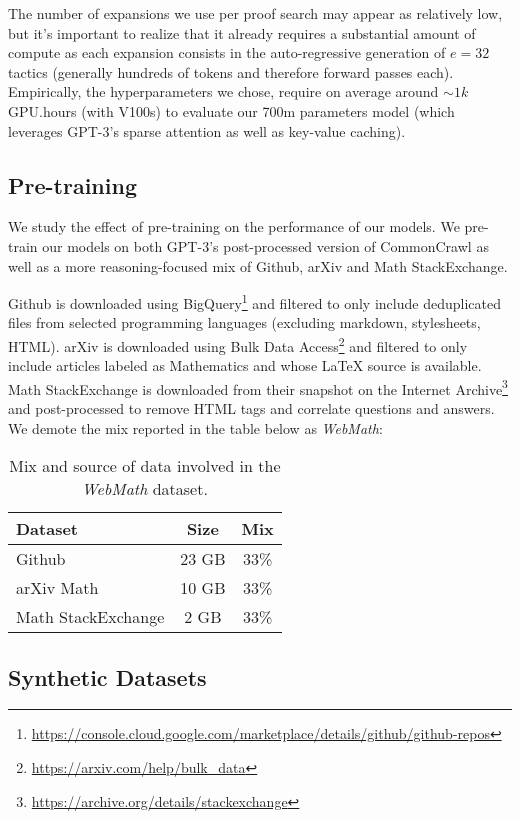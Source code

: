 \documentclass{article}
\begin{document}
The number of expansions we use per proof search may appear as relatively low, but it's important to realize that it already requires a substantial amount of compute as each expansion consists in the auto-regressive generation of $e=32$ tactics (generally hundreds of tokens and therefore forward passes each). Empirically, the hyperparameters we chose, require on average around $\sim 1k$ GPU.hours (with V100s) to evaluate our 700m parameters model (which leverages GPT-3's sparse attention as well as key-value caching).

\subsection{Pre-training}

We study the effect of pre-training on the performance of our models. We pre-train our models on both GPT-3's post-processed version of CommonCrawl as well as a more reasoning-focused mix of Github, arXiv and Math StackExchange.

Github is downloaded using BigQuery\footnote{\url{https://console.cloud.google.com/marketplace/details/github/github-repos}} and filtered to only include deduplicated files from selected programming languages (excluding markdown, stylesheets, HTML). arXiv is downloaded using Bulk Data Access\footnote{\url{https://arxiv.com/help/bulk\_data}} and filtered to only include articles labeled as Mathematics and whose LaTeX source is available. Math StackExchange is downloaded from their snapshot on the Internet Archive\footnote{\url{https://archive.org/details/stackexchange}} and post-processed to remove HTML tags and correlate questions and answers. We demote the mix reported in the table below as \textit{WebMath}:

\begin{table}[ht]
\caption{Mix and source of data involved in the \textit{WebMath} dataset.}
\centering
\begin{tabular}{ |l|c|c| }
    \hline
    Dataset & Size & Mix \\
    \hline
    Github & 23 GB & 33\% \\
    arXiv Math & 10 GB & 33\% \\
    Math StackExchange & 2 GB & 33\% \\
    \hline
\end{tabular}
\label{table:webmathmix}
\end{table}

\subsection{Synthetic Datasets}
\end{document}
